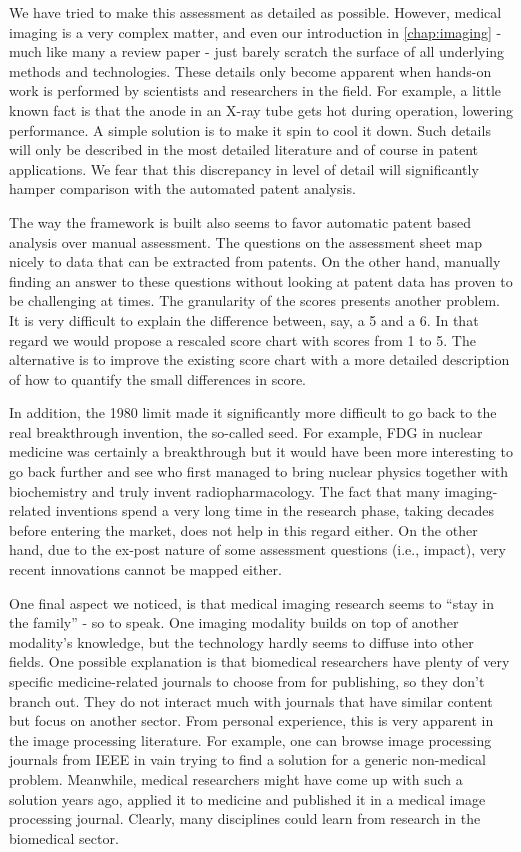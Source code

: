 We have tried to make this assessment as detailed as possible. However, medical
imaging is a very complex matter, and even our introduction in
\autoref{chap:imaging} - much like many a review paper - just barely scratch the
surface of all underlying methods and technologies. These details only become
apparent when hands-on work is performed by scientists and researchers in the
field. For example, a little known fact is that the anode in an X-ray tube gets
hot during operation, lowering performance. A simple solution is to make it spin
to cool it down. Such details will only be described in the most detailed
literature and of course in patent applications. We fear that this discrepancy
in level of detail will significantly hamper comparison with the automated
patent analysis.

The way the framework is built also seems to favor automatic patent based
analysis over manual assessment. The questions on the assessment sheet map
nicely to data that can be extracted from patents. On the other hand, manually
finding an answer to these questions without looking at patent data has proven
to be challenging at times. The granularity of the scores presents another
problem. It is very difficult to explain the difference between, say, a 5 and a
6. In that regard we would propose a rescaled score chart with scores from 1 to
5. The alternative is to improve the existing score chart with a more detailed
description of how to quantify the small differences in score.

In addition, the 1980 limit made it significantly more difficult to go back to
the real breakthrough invention, the so-called seed. For example, FDG in nuclear
medicine was certainly a breakthrough but it would have been more interesting to
go back further and see who first managed to bring nuclear physics together with
biochemistry and truly invent radiopharmacology. The fact that many
imaging-related inventions spend a very long time in the research phase, taking
decades before entering the market, does not help in this regard either. On the
other hand, due to the ex-post nature of some assessment questions (i.e.,
impact), very recent innovations cannot be mapped either.

One final aspect we noticed, is that medical imaging research seems to ``stay in
the family'' - so to speak. One imaging modality builds on top of another
modality's knowledge, but the technology hardly seems to diffuse into other
fields. One possible explanation is that biomedical researchers have plenty of
very specific medicine-related journals to choose from for publishing, so they
don't branch out. They do not interact much with journals that have similar
content but focus on another sector. From personal experience, this is very
apparent in the image processing literature. For example, one can browse image
processing journals from IEEE in vain trying to find a solution for a generic
non-medical problem. Meanwhile, medical researchers might have come up with such
a solution years ago, applied it to medicine and published it in a medical image
processing journal. Clearly, many disciplines could learn from research in the
biomedical sector.
